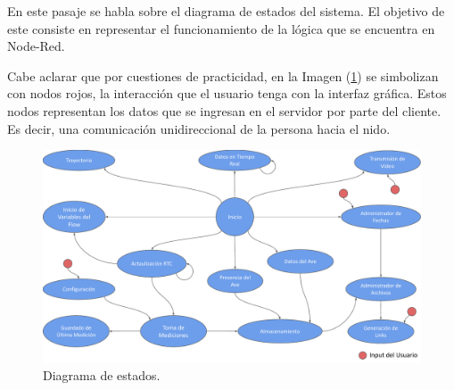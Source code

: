 En este pasaje se habla sobre el diagrama de estados del sistema. El objetivo de este consiste en representar el funcionamiento de la lógica que se encuentra en Node-Red.

Cabe aclarar que por cuestiones de practicidad, en la Imagen (\ref{fig:diagrama_de_estados}) se simbolizan con nodos rojos, la interacción que el usuario tenga con la interfaz gráfica. Estos nodos representan los datos que se ingresan en el servidor por parte del cliente. Es decir, una comunicación unidireccional de la persona hacia el nido.

\begin{figure}[H]
	\centering	
	\includegraphics[width=\textwidth, page=1]{ImagenesIngenieria de Detalle/FlowChartNodeRed.pdf}	
	\caption{Diagrama de estados.}
	\label{fig:diagrama_de_estados}
\end{figure}
